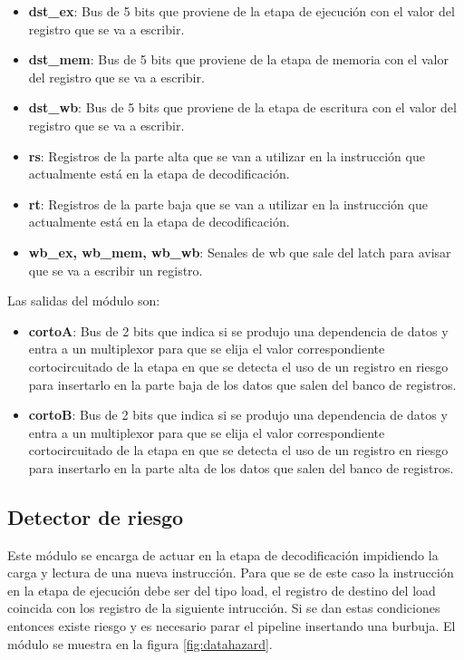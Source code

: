 \begin{itemize}
  \item \textbf{dst\_ex}: Bus de 5 bits que proviene de la etapa de ejecuci\'on con el valor del registro que se va a escribir.
  \item \textbf{dst\_mem}: Bus de 5 bits que proviene de la etapa de memoria	con el valor del registro que se va a escribir.
  \item \textbf{dst\_wb}: Bus de 5 bits que proviene de la etapa de escritura con el valor del registro que se va a escribir.
  \item \textbf{rs}: Registros de la parte alta que se van a utilizar en la instrucci\'on que actualmente est\'a en la etapa de decodificaci\'on.
  \item \textbf{rt}: Registros de la parte baja que se van a utilizar en la instrucci\'on que actualmente est\'a en la etapa de decodificaci\'on.
  \item \textbf{wb\_ex, wb\_mem, wb\_wb}: Senales de wb que sale del latch para avisar que se va a escribir un registro.  
\end{itemize}

Las salidas del m\'odulo son:
\begin{itemize}
  \item \textbf{cortoA}: Bus de 2 bits que indica si se produjo una dependencia de datos y entra a un multiplexor para que se elija el valor correspondiente cortocircuitado de la etapa en que se detecta el uso de un registro en riesgo para insertarlo en la parte baja de los datos que salen del banco de registros. 
  \item \textbf{cortoB}: Bus de 2 bits que indica si se produjo una dependencia de datos y entra a un multiplexor para que se elija el valor correspondiente cortocircuitado de la etapa en que se detecta el uso de un registro en riesgo para insertarlo en la parte alta de los datos que salen del banco de registros.
\end{itemize}

\subsection{Detector de riesgo}

Este m\'odulo se encarga de actuar en la etapa de decodificaci\'on impidiendo la carga y lectura de una nueva instrucci\'on. Para que se de este caso la instrucci\'on en la etapa de ejecuci\'on debe ser del tipo load, el registro de destino del load coincida con los registro de la siguiente intrucci\'on. Si se dan estas condiciones entonces existe riesgo y es necesario parar el pipeline insertando una burbuja. El m\'odulo se muestra en la figura \ref{fig:datahazard}.

